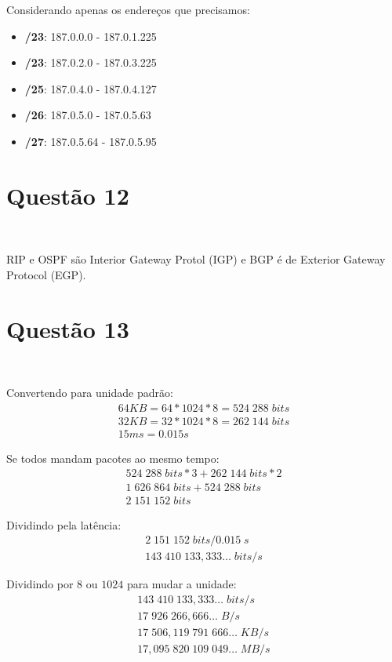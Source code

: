\documentclass{article}
\begin{document}
Considerando apenas os endereços que precisamos:
\begin{itemize}
    \item \textbf{/23}: 187.0.0.0 - 187.0.1.225
    \item \textbf{/23}: 187.0.2.0 - 187.0.3.225
    \item \textbf{/25}: 187.0.4.0 - 187.0.4.127
    \item \textbf{/26}: 187.0.5.0 - 187.0.5.63
    \item \textbf{/27}: 187.0.5.64 - 187.0.5.95
\end{itemize}

\newpage
\section*{Questão 12}\

RIP e OSPF são Interior Gateway Protol (IGP) e BGP é de Exterior Gateway
Protocol (EGP).

\section*{Questão 13}\

Convertendo para unidade padrão:
\begin{gather*}
    64KB = 64 * 1024 * 8 = 524 \; 288 \; bits \\
    32KB = 32 * 1024 * 8 = 262 \; 144 \; bits \\
    15ms = 0.015s
\end{gather*}

Se todos mandam pacotes ao mesmo tempo:
\begin{gather*}
    524 \; 288 \; bits * 3 + 262 \; 144 \; bits * 2 \\
    1 \; 626 \; 864 \; bits + 524 \; 288 \; bits \\
    2 \; 151 \; 152 \; bits
\end{gather*}

Dividindo pela latência:
\begin{gather*}
    2 \; 151 \; 152 \; bits / 0.015 \; s \\
    143 \; 410 \; 133, 333 \dots \; bits/s
\end{gather*}

Dividindo por \(8\) ou \(1024\) para mudar a unidade:
\begin{gather*}
    143 \; 410 \; 133, 333 \dots \; bits/s \\
     17 \; 926 \; 266, 666 \dots \; B/s \\
     17 \; 506, 119 \; 791 \; 666 \dots \; KB/s \\
     17, 095 \; 820 \; 109 \; 049 \dots \; MB/s
\end{gather*}
\end{document}
